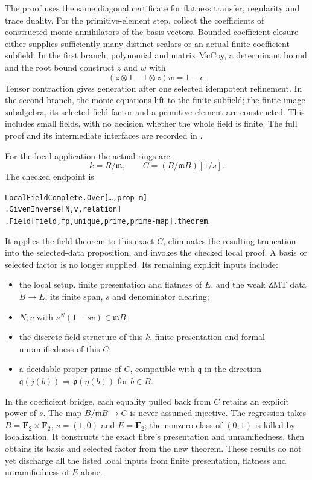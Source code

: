 \documentclass[11pt]{amsart}
\numberwithin{equation}{section}
\theoremstyle{definition}
\theoremstyle{remark}
\newcommand{\m}{\mathfrak m}
\newcommand{\q}{\mathfrak q}
\newcommand{\code}[1]{\texttt{#1}}
\begin{document}
The proof uses the same diagonal certificate for flatness transfer,
regularity and trace duality. For the primitive-element step, collect
the coefficients of constructed monic annihilators of the basis
vectors. Bounded coefficient closure either supplies sufficiently many
distinct scalars or an actual finite coefficient subfield. In the first
branch, polynomial and matrix McCoy, a determinant bound and the root
bound construct $z$ and $w$ with
\[
 (z\otimes1-1\otimes z)w=1-\epsilon.
\]
Tensor contraction gives generation after one selected idempotent
refinement. In the second branch, the monic equations lift to the finite
subfield; the finite image subalgebra, its selected field factor and a
primitive element are constructed. This includes small fields, with no
decision whether the whole field is finite. The full proof and its
intermediate interfaces are recorded in \cite{Field}.

For the local application the actual rings are
\[
 k=R/\m,\qquad C=(B/\m B)[1/s].
\]
The checked endpoint is
\begin{center}
\code{LocalFieldComplete.Over[\ldots,prop-m]}\\
\code{.GivenInverse[N,v,relation]}\\
\code{.Field[field,fp,unique,prime,prime-map].theorem}.
\end{center}
It applies the field theorem to this exact $C$, eliminates the resulting
truncation into the selected-data proposition, and invokes the checked
local proof. A basis or selected factor is no longer supplied.
Its remaining explicit inputs include:
\begin{itemize}
\item the local setup, finite presentation and flatness of $E$, and
the weak ZMT data $B\to E$, its finite span, $s$ and denominator clearing;
\item $N,v$ with $s^N(1-sv)\in\m B$;
\item the discrete field structure of this $k$, finite presentation and
formal unramifiedness of this $C$;
\item a decidable proper prime of $C$, compatible with $\q$ in the
direction $\q(j(b))\Rightarrow\mathfrak p(\eta(b))$ for $b\in B$.
\end{itemize}
In the coefficient bridge, each equality pulled back from $C$ retains
an explicit power of $s$. The map $B/\m B\to C$ is never assumed
injective. The regression takes $B=\mathbf F_2\times\mathbf F_2$,
$s=(1,0)$ and $E=\mathbf F_2$; the nonzero class of $(0,1)$ is killed
by localization. It constructs the exact fibre's presentation and
unramifiedness, then obtains its basis and selected factor from the new
theorem. These results do not yet discharge all the listed local inputs
from finite presentation, flatness and unramifiedness of $E$ alone.
\end{document}
